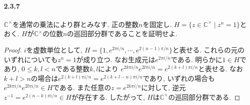 \paragraph{2.3.7}
$\mathbb{C}^\times$を通常の乗法により群とみなす.
正の整数$n$を固定し. $H=\{z \in \mathbb{C}^\times \mid z^n=1\}$とおく.
$H$が$\mathbb{C}^\times$の位数$n$の巡回部分群であることを証明せよ.
\begin{proof}
  $i$を虚数単位として, $H=\{1,e^{2\pi i/n},\cdots, e^{2(n-1)\pi/n}\}$と表せる.
  これらの元のいずれについても$z^n=1$が成り立つ. なお生成元は$e^{2\pi i/n}$である.
  明らかに$1 \in H$であり, $0\leq k,l <n$である整数$k,l$により
  $e^{2k\pi i/n}e^{2l\pi i/n}=e^{2(k+l)\pi i/n}$と表せる.
  なお$k+l>n$の場合は$e^{2(k+l)\pi i/n}=e^{2(k+l-n)\pi i/n}$であり,
  いずれの場合も$e^{2k\pi i/n}e^{2l\pi i/n} \in H$である.
  また任意の$z=e^{2k\pi i/n}$に対して,
  逆元$z^{-1}=e^{2(n-k)\pi i/n} \in H$が存在する.
  したがって, $H$は$\mathbb{C}^\times$の巡回部分群である.
\end{proof}\leavevmode

